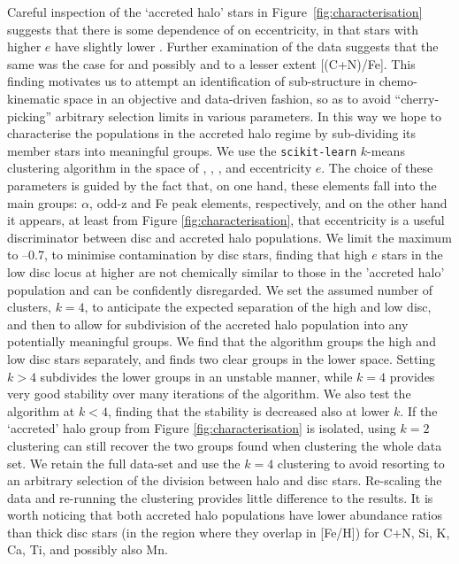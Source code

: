 Careful inspection of the `accreted halo' stars in
Figure~\ref{fig:characterisation} suggests that there is some
dependence of \mgfe{} on eccentricity, in that stars with higher
$e$ have slightly lower \mgfe{}.  Further examination of the data
suggests that the same was the case for \alfe{} and possibly \nife{}
and to a lesser extent [(C+N)/Fe].  
 This finding motivates us to attempt an identification
of sub-structure in chemo-kinematic space in an objective and
data-driven fashion, so as to avoid ``cherry-picking'' arbitrary
selection limits in various parameters.  In this way we hope to
characterise the populations in the accreted halo regime by
sub-dividing its member stars into meaningful groups.  We use the
\texttt{scikit-learn} $k$-means clustering algorithm \citep{scikit-learn}
in the space of \feh{}, \mgfe{}, \alfe{}, \nife{} and eccentricity
$e$.  The choice of these parameters is guided by the fact that,
on one hand, these elements fall into the main groups: $\alpha$,
odd-z and Fe peak elements, respectively, and on the other hand it
appears, at least from Figure \ref{fig:characterisation}, that
eccentricity is a useful discriminator between disc and accreted
halo populations.  We limit the maximum \feh{} to --0.7, to minimise
contamination by disc stars, finding that high $e$ stars in the low \afe{} disc locus at higher \feh{} are not chemically similar to those in the 'accreted halo' population and can be confidently disregarded. We set the assumed number of clusters,
$k= 4$, to anticipate the expected separation of the high and low \afe{} disc, and then
to allow for subdivision of the accreted halo population into any potentially meaningful
groups.  We find that the algorithm groups the high and low \afe{}
disc stars separately, and finds two clear groups in the lower
\feh{} space.  Setting $k>4$ subdivides the lower \feh{} groups in
an unstable manner, while $k=4$ provides very good stability over
many iterations of the algorithm. We also test the algorithm at $k
< 4$, finding that the stability is decreased also at lower $k$.
If the `accreted' halo group from Figure \ref{fig:characterisation}
is isolated, using $k=2$ clustering can still recover the two groups
found when clustering the whole data set. We retain the full data-set
and use the $k=4$ clustering to avoid resorting to an arbitrary
selection of the division between halo and disc stars. Re-scaling
the data and re-running the clustering provides little difference to
the results. It is worth noticing that both accreted halo
populations have lower abundance ratios than thick disc stars (in
the region where they overlap in [Fe/H]) for C+N, Si, K, Ca, Ti,
and possibly also Mn.


